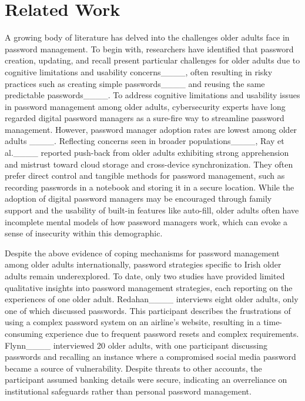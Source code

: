 \section{Related Work}
A growing body of literature has delved into the challenges older adults face in password management. To begin with, researchers have identified that password creation, updating, and recall present particular challenges for older adults due to cognitive limitations and usability concerns____, often resulting in risky practices such as creating simple passwords____ and reusing the same predictable passwords____. To address cognitive limitations and usability issues in password management among older adults, cybersecurity experts have long regarded digital password managers as a sure-fire way to streamline password management. However, password manager adoption rates are lowest among older adults ____. Reflecting concerns seen in broader populations____, Ray et al.____ reported push-back from older adults exhibiting strong apprehension and mistrust toward cloud storage and cross-device synchronization. They often prefer direct control and tangible methods for password management, such as recording passwords in a notebook and storing it in a secure location. While the adoption of digital password managers may be encouraged through family support and the usability of built-in features like auto-fill, older adults often have incomplete mental models of how password managers work, which can evoke a sense of insecurity within this demographic. 


Despite the above evidence of coping mechanisms for password management among older adults internationally, password strategies specific to Irish older adults remain underexplored. To date, only two studies have provided limited qualitative insights into password management strategies, each reporting on the experiences of one older adult. Redahan____ interviews eight older adults, only one of which discussed passwords. This participant describes the frustrations of using a complex password system on an airline's website, resulting in a time-consuming experience due to frequent password resets and complex requirements. Flynn____ interviewed 20 older adults, with one participant discussing passwords and recalling an instance where a compromised social media password became a source of vulnerability.
Despite threats to other accounts, the participant assumed banking details were secure, indicating an overreliance on institutional safeguards rather than personal password management.


